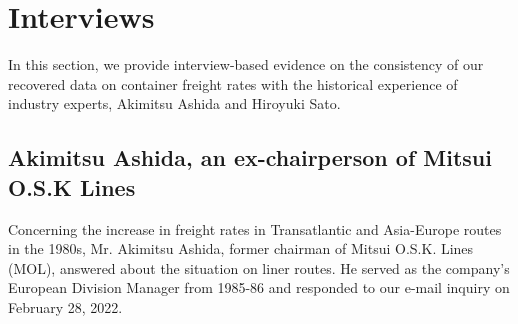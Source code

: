 \documentclass[11pt]{article}
\begin{document}




\section{Interviews}\label{sec:interview}

In this section, we provide interview-based evidence on the consistency of our recovered data on container freight rates with the historical experience of industry experts, Akimitsu Ashida and Hiroyuki Sato.

\subsection{Akimitsu Ashida, an ex-chairperson of Mitsui O.S.K Lines}

Concerning the increase in freight rates in Transatlantic and Asia-Europe routes in the 1980s, Mr. Akimitsu Ashida, former chairman of Mitsui O.S.K. Lines (MOL), answered about the situation on liner routes. He served as the company's European Division Manager from 1985-86 and responded to our e-mail inquiry on February 28, 2022.\\

\end{document}
